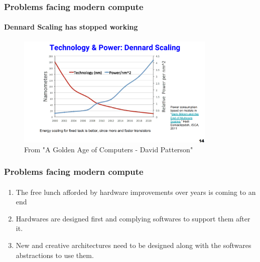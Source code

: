 \documentclass{beamer}
\begin{document}
\begin{frame}[fragile]
\frametitle{Problems facing modern compute}
  \framesubtitle{Dennard Scaling has stopped working}

  \begin{figure}
    \centering
    \includegraphics[width=0.85\textwidth]{dennardscaling.png}
    \caption{From "A Golden Age of Computers - David Patterson"}
  \end{figure}
\end{frame}

\begin{frame}[fragile]
\frametitle{Problems facing modern compute}
  \framesubtitle{}
  \begin{enumerate}
    \item The free lunch afforded by hardware improvements over years
      is coming to an end
    \item Hardwares are designed first and complying softwares to support
      them after it.
    \item New and creative architectures need to be designed along with the
      softwares abstractions to use them. 
  \end{enumerate}
\end{frame}
\end{document}
